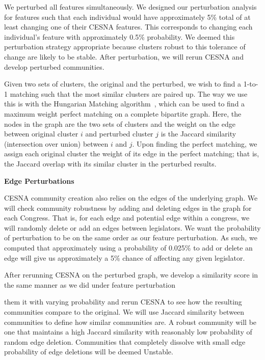 We perturbed all features simultaneously. We designed our perturbation analysis
for features such that each individual would have approximately 5\% total of at
least changing one of their CESNA features. This corresponds to changing each
individual's feature with approximately 0.5\% probability. We deemed this
perturbation strategy appropriate because clusters robust to this tolerance of
change are likely to be stable. After perturbation, we will rerun CESNA and
develop perturbed communities.

Given two sets of clusters, the original and the perturbed, we wish to find a
1-to-1 matching such that the most similar clusters are paired up. The way we
use this is with the Hungarian Matching algorithm~\cite{Munkres}, which can be
used to find a maximum weight perfect matching on a complete bipartite graph.
Here, the nodes in the graph are the two sets of clusters and the weight on the
edge between original cluster $i$ and perturbed cluster $j$ is the Jaccard
similarity (intersection over union) between $i$ and $j$. Upon finding the
perfect matching, we assign each original cluster the weight of its edge in the
perfect matching; that is, the Jaccard overlap with its similar cluster in the
perturbed results.

\textbf{Edge Perturbations}

CESNA community creation also relies on the edges of the underlying graph. We
will check community robustness by adding and deleting edges in the graph for
each Congress. That is, for each edge and potential edge within a congress, we
will randomly delete or add an edges between legislators. We want the
probability of perturbation to be on the same order as our feature perturbation.
As such, we computed that approximately using a probability of 0.025\% to add or
delete an edge will give us approximately a 5\% chance of affecting any given
legislator.

After rerunning CESNA on the perturbed graph, we develop a similarity score in
the same manner as we did under feature perturbation

them it with varying probability and rerun CESNA to see how the resulting 
communities compare to the original. We will use Jaccard similarity between 
communities to define how similar communities are. A robust community will be 
one that maintains a high Jaccard similarity with reasonably low probability of 
random edge deletion. Communities that completely dissolve with small edge 
probability of edge deletions will be deemed Unstable.


